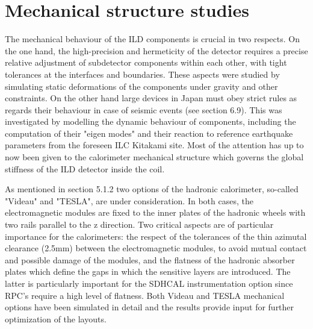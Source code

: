 \section{Mechanical structure studies}
\label{ild:sec:mechanical_structures}

The mechanical behaviour of the ILD components is crucial in two respects. On the one hand, the high-precision and hermeticity of the detector requires a precise relative adjustment of subdetector components within each other, with tight tolerances at the interfaces and boundaries. These aspects were studied by simulating static deformations of the components under gravity and other constraints. On the other hand large devices in Japan must obey strict rules as regards their behaviour in case of seismic events (see section 6.9). This was investigated by modelling the dynamic behaviour of components, including the computation of their "eigen modes" and their reaction to reference earthquake parameters from the foreseen ILC Kitakami site. Most of the attention has up to now been given to the calorimeter mechanical structure which governs the global stiffness of the ILD detector inside the coil. %


As mentioned in section 5.1.2 two options of the hadronic calorimeter, so-called "Videau" and "TESLA", are under consideration. In both cases, the electromagnetic modules are fixed to the inner plates of the hadronic wheels with two rails parallel to the z direction. Two critical aspects are of particular importance for the calorimeters: the respect of the tolerances of the thin azimutal clearance (2.5mm) between the electromagnetic modules, to avoid mutual contact and possible damage of the modules, and the flatness of the hadronic absorber plates which define the gaps in which the sensitive layers are introduced. The latter is particularly important for the SDHCAL instrumentation option since RPC's require a high level of flatness. Both Videau and TESLA mechanical options have been simulated in detail and the results provide input for further optimization of the layouts.


